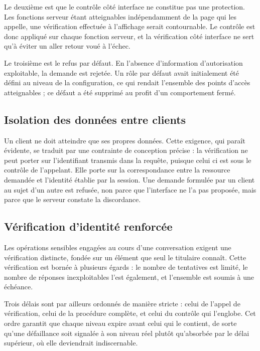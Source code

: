 Le deuxième est que le contrôle côté interface ne constitue pas une protection. Les fonctions serveur étant atteignables indépendamment de la page qui les appelle, une vérification effectuée à l'affichage serait contournable. Le contrôle est donc appliqué sur chaque fonction serveur, et la vérification côté interface ne sert qu'à éviter un aller retour voué à l'échec.

Le troisième est le refus par défaut. En l'absence d'information d'autorisation exploitable, la demande est rejetée. Un rôle par défaut avait initialement été défini au niveau de la configuration, ce qui rendait l'ensemble des points d'accès atteignables ; ce défaut a été supprimé au profit d'un comportement fermé.

\subsection{Isolation des données entre clients}

Un client ne doit atteindre que ses propres données. Cette exigence, qui paraît évidente, se traduit par une contrainte de conception précise : la vérification ne peut porter sur l'identifiant transmis dans la requête, puisque celui ci est sous le contrôle de l'appelant. Elle porte sur la correspondance entre la ressource demandée et l'identité établie par la session. Une demande formulée par un client au sujet d'un autre est refusée, non parce que l'interface ne l'a pas proposée, mais parce que le serveur constate la discordance.

\subsection{Vérification d'identité renforcée}

Les opérations sensibles engagées au cours d'une conversation exigent une vérification distincte, fondée sur un élément que seul le titulaire connaît. Cette vérification est bornée à plusieurs égards : le nombre de tentatives est limité, le nombre de réponses inexploitables l'est également, et l'ensemble est soumis à une échéance.

Trois délais sont par ailleurs ordonnés de manière stricte : celui de l'appel de vérification, celui de la procédure complète, et celui du contrôle qui l'englobe. Cet ordre garantit que chaque niveau expire avant celui qui le contient, de sorte qu'une défaillance soit signalée à son niveau réel plutôt qu'absorbée par le délai supérieur, où elle deviendrait indiscernable.

